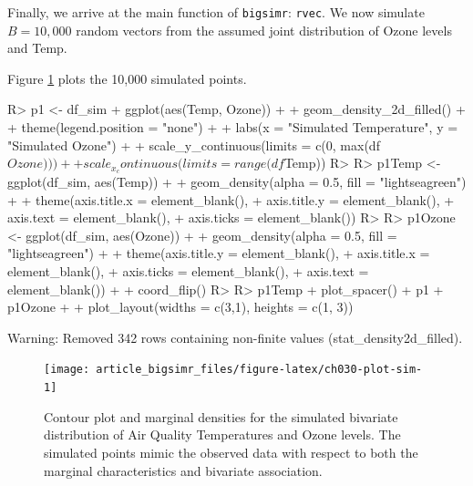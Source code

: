 \documentclass[
]{jss}
\begin{document}
Finally, we arrive at the main function of \texttt{bigsimr}: \texttt{rvec}. We now simulate \(B=10,000\) random vectors from the assumed joint distribution of Ozone levels and Temp.

\begin{CodeChunk}
\end{CodeChunk}

Figure \ref{fig:ch030-plot-sim} plots the 10,000 simulated points.

\begin{CodeChunk}
\begin{CodeInput}
R> p1 <- df_sim %
+   ggplot(aes(Temp, Ozone)) +
+   geom_density_2d_filled() +
+   theme(legend.position = "none") +
+   labs(x = "Simulated Temperature", y = "Simulated Ozone") +
+   scale_y_continuous(limits = c(0, max(df$Ozone))) +
+   scale_x_continuous(limits = range(df$Temp))
R> 
R> p1Temp <- ggplot(df_sim, aes(Temp)) + 
+   geom_density(alpha = 0.5, fill = "lightseagreen") +
+   theme(axis.title.x = element_blank(),
+         axis.title.y = element_blank(),
+         axis.text = element_blank(),
+         axis.ticks = element_blank())
R> 
R> p1Ozone <- ggplot(df_sim, aes(Ozone)) + 
+   geom_density(alpha = 0.5, fill = "lightseagreen") + 
+   theme(axis.title.y = element_blank(),
+         axis.title.x = element_blank(),
+         axis.ticks = element_blank(),
+         axis.text = element_blank()) +
+   coord_flip() 
R> 
R> p1Temp + plot_spacer() + p1 + p1Ozone + 
+   plot_layout(widths = c(3,1), heights = c(1, 3))
\end{CodeInput}
\begin{CodeOutput}
Warning: Removed 342 rows containing non-finite values (stat_density2d_filled).
\end{CodeOutput}
\begin{figure}

{\centering \texttt{[image: article\_bigsimr\_files/figure-latex/ch030-plot-sim-1]} 

}

\caption[Contour plot and marginal densities for the simulated bivariate distribution of Air Quality Temperatures and Ozone levels]{Contour plot and marginal densities for the simulated bivariate distribution of Air Quality Temperatures and Ozone levels. The simulated points mimic the observed data with respect to both the marginal characteristics and bivariate association.}\label{fig:ch030-plot-sim}
\end{figure}
\end{CodeChunk}
\end{document}

